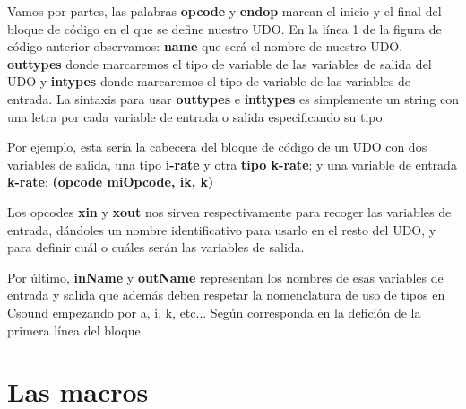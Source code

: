 
Vamos por partes, las palabras \textbf{opcode} y \textbf{endop} marcan el inicio y el final del bloque de código en el que se define nuestro UDO. En la línea 1 de la figura de código anterior observamos: \textbf{name} que será el nombre de nuestro UDO, \textbf{outtypes} donde marcaremos el tipo de variable de las variables de salida del UDO y \textbf{intypes} donde marcaremos el tipo de variable de las variables de entrada. La sintaxis para usar \textbf{outtypes} e \textbf{inttypes} es simplemente un string con una letra por cada variable de entrada o salida especificando su tipo.

Por ejemplo, esta sería la cabecera del bloque de código de un UDO con dos variables de salida, una tipo \textbf{i-rate} y otra \textbf{tipo k-rate}; y una variable de entrada \textbf{k-rate}: \textbf{(opcode miOpcode, ik, k)}

Los opcodes \textbf{xin} y \textbf{xout} nos sirven respectivamente para recoger las variables de entrada, dándoles un nombre identificativo para usarlo en el resto del UDO, y para definir cuál o cuáles serán las variables de salida.

Por último, \textbf{inName} y \textbf{outName} representan los nombres de esas variables de entrada y salida que además deben respetar la nomenclatura de uso de tipos en Csound empezando por a, i, k, etc... Según corresponda en la defición de la primera línea del bloque.
\section{Las macros}
